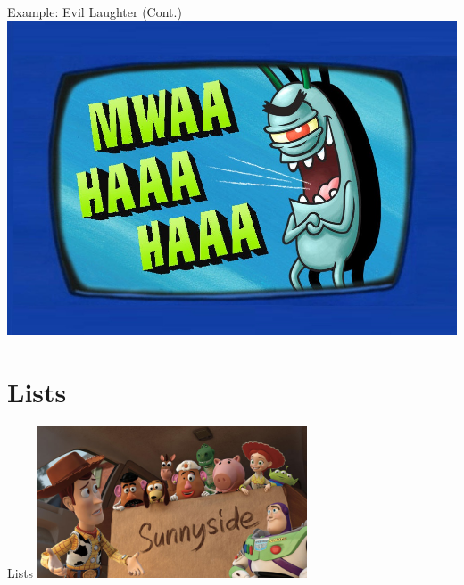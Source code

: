         \begin{frame}{Example: Evil Laughter (Cont.)}
            \centering
            \includegraphics[height=0.8\textheight]{images/evil_laugh.jpg}
        \end{frame}

    \section{Lists}
        \begin{frame}{Lists}
            \centering
            \includegraphics[width=0.6\textwidth]{../Lecture1/images/box_many.jpg}
            
        
        \end{frame}

